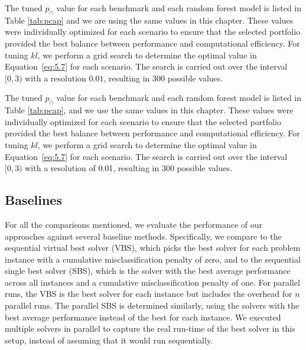 The tuned $p_{\cap}$ value for each benchmark and each random forest model is listed in Table \ref{tab:pcap} and we are using the same values in this chapter. These values were individually optimized for each scenario to ensure that the selected portfolio provided the best balance between performance and computational efficiency. For tuning $kl$, we perform a grid search to determine the optimal value in Equation~\ref{eq:5.7} for each scenario. The search is carried out over the interval $[0, 3)$ with a resolution $0.01$, resulting in 300 possible values. 

The tuned $p_{\cap}$ value for each benchmark and each random forest model is listed in Table \ref{tab:pcap}, and we use the same values in this chapter. These values were individually optimized for each scenario to ensure that the selected portfolio provided the best balance between performance and computational efficiency. For tuning $kl$, we perform a grid search to determine the optimal value in Equation~\ref{eq:5.7} for each scenario. The search is carried out over the interval $[0, 3)$ with a resolution of 0.01, resulting in 300 possible values.

\subsection{Baselines}

For all the comparisons mentioned, we evaluate the performance of our approaches against several baseline methods. Specifically, we compare to the sequential virtual best solver (VBS), which picks the best solver for each problem instance with a cumulative misclassification penalty of zero, and to the sequential single best solver (SBS), which is the solver with the best average performance across all instances and a cumulative misclassification penalty of one. For parallel runs, the VBS is the best solver for each instance but includes the overhead for $n$ parallel runs. The parallel SBS is determined similarly, using the solvers with the best average performance instead of the best for each instance. We executed multiple solvers in parallel to capture the real run-time of the best solver in this setup, instead of assuming that it would run sequentially.

